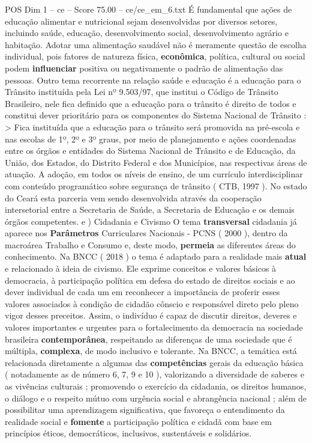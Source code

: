\begin{textsample}{POS Dim 1 – ce – Score 75.00 – ce/ce\_em\_6.txt}
É fundamental que ações de educação alimentar e nutricional sejam desenvolvidas por diversos setores, incluindo saúde, educação, desenvolvimento social, desenvolvimento agrário e habitação.
Adotar uma alimentação saudável não é meramente questão de escolha individual, pois fatores de natureza física, \textbf{econômica}, política, cultural ou social podem \textbf{influenciar} positiva ou negativamente o padrão de alimentação das pessoas.
Outro tema recorrente na relação saúde e educação é a educação para o Trânsito instituída pela Lei nº 9.503/97, que institui o Código de Trânsito Brasileiro, nele fica definido que a educação para o trânsito é direito de todos e constitui dever prioritário para os componentes do Sistema Nacional de Trânsito : > Fica instituída que a educação para o trânsito será promovida na pré-escola e nas escolas de 1º, 2º e 3º graus, por meio de planejamento e ações coordenadas entre os órgãos e entidades do Sistema Nacional de Trânsito e de Educação, da União, dos Estados, do Distrito Federal e dos Municípios, nas respectivas áreas de atuação.
A adoção, em todos os níveis de ensino, de um currículo interdisciplinar com conteúdo programático sobre segurança de trânsito ( CTB, 1997 ).
No estado do Ceará esta parceria vem sendo desenvolvida através da cooperação intersetorial entre a Secretaria de Saúde, a Secretaria de Educação e os demais órgãos competentes. e ) Cidadania e Civismo O tema \textbf{transversal} cidadania já aparece nos \textbf{Parâmetros} Curriculares Nacionais - PCNS ( 2000 ), dentro da macroárea Trabalho e Consumo e, deste modo, \textbf{permeia} as diferentes áreas do conhecimento.
Na BNCC ( 2018 ) o tema é adaptado para a realidade mais \textbf{atual} e relacionado à ideia de civismo.
Ele exprime conceitos e valores básicos à democracia, à participação política em defesa do estado de direitos sociais e ao dever individual de cada um em reconhecer a importância de proferir esses valores associados à condição de cidadão cônscio e responsável direto pelo pleno vigor desses preceitos.
Assim, o indivíduo é capaz de discutir direitos, deveres e valores importantes e urgentes para o fortalecimento da democracia na sociedade brasileira \textbf{contemporânea}, respeitando as diferenças de uma sociedade que é múltipla, \textbf{complexa}, de modo inclusivo e tolerante.
Na BNCC, a temática está relacionada diretamente a algumas das \textbf{competências} gerais da educação básica ( notadamente as de número 6, 7, 9 e 10 ), valorizando a diversidade de saberes e as vivências culturais ; promovendo o exercício da cidadania, os direitos humanos, o diálogo e o respeito mútuo com urgência social e abrangência nacional ; além de possibilitar uma aprendizagem significativa, que favoreça o entendimento da realidade social e \textbf{fomente} a participação política e cidadã com base em princípios éticos, democráticos, inclusivos, sustentáveis e solidários.

\end{textsample}
